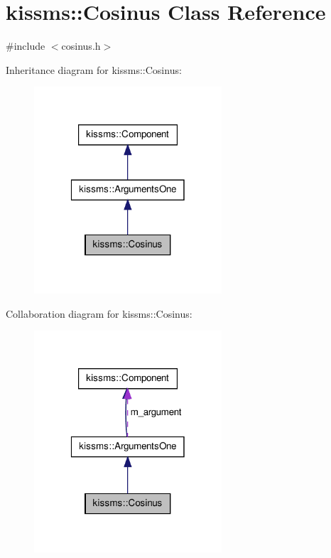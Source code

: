 \hypertarget{classkissms_1_1_cosinus}{\section{kissms\-:\-:Cosinus Class Reference}
\label{classkissms_1_1_cosinus}
}


{\ttfamily \#include $<$cosinus.\-h$>$}



Inheritance diagram for kissms\-:\-:Cosinus\-:
\nopagebreak
\begin{figure}[H]
\begin{center}
\leavevmode
\includegraphics[width=198pt]{classkissms_1_1_cosinus__inherit__graph}
\end{center}
\end{figure}


Collaboration diagram for kissms\-:\-:Cosinus\-:
\nopagebreak
\begin{figure}[H]
\begin{center}
\leavevmode
\includegraphics[width=198pt]{classkissms_1_1_cosinus__coll__graph}
\end{center}
\end{figure}

